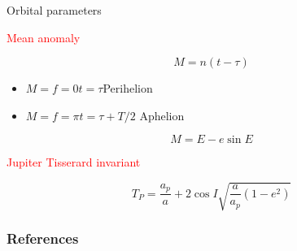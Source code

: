 \documentclass{beamer}
\begin{document}
\begin{frame}{Orbital parameters}
\begin{center}
\textcolor{red}{Mean anomaly}
\end{center}
\begin{equation}
M=n(t-\tau)
\end{equation}

\begin{center}
\begin{itemize}
\item $M=f=0$\quad$t=\tau$\quad Perihelion
\item $M=f=\pi$\quad$t=\tau+T/2$ \quad Aphelion
\end{itemize}
\end{center}

\begin{equation}
M=E-e\sin E
\end{equation}

\begin{center}
\textcolor{red}{Jupiter Tisserard invariant }
\end{center}



\begin{equation}
T_{P}=\frac{a_{p}}{a}+2\cos I\sqrt{\dfrac{a}{a_{p}}(1-e^{2})}
\end{equation}

\end{frame}

\begin{frame}[t,allowframebreaks]
\frametitle{References}
\printbibliography
\end{frame}
\end{document}
